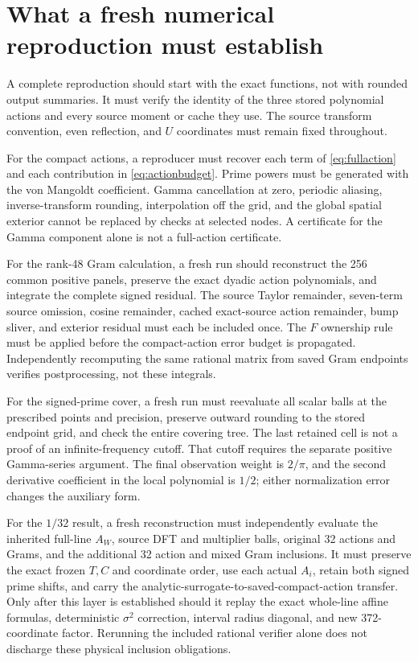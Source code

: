 \documentclass[11pt,a4paper]{article}
\numberwithin{equation}{section}
\theoremstyle{definition}\newtheorem{definition}[theorem]{Definition}
\theoremstyle{remark}\newtheorem{remark}[theorem]{Remark}
\begin{document}
\section{What a fresh numerical reproduction must establish}\label{app:fresh}
A complete reproduction should start with the exact functions, not with rounded output summaries. It must verify the identity of the three stored polynomial actions and every source moment or cache they use. The source transform convention, even reflection, and $U$ coordinates must remain fixed throughout.

For the compact actions, a reproducer must recover each term of \eqref{eq:fullaction} and each contribution in \eqref{eq:actionbudget}. Prime powers must be generated with the von Mangoldt coefficient. Gamma cancellation at zero, periodic aliasing, inverse-transform rounding, interpolation off the grid, and the global spatial exterior cannot be replaced by checks at selected nodes. A certificate for the Gamma component alone is not a full-action certificate.

For the rank-48 Gram calculation, a fresh run should reconstruct the 256 common positive panels, preserve the exact dyadic action polynomials, and integrate the complete signed residual. The source Taylor remainder, seven-term source omission, cosine remainder, cached exact-source action remainder, bump sliver, and exterior residual must each be included once. The $F$ ownership rule must be applied before the compact-action error budget is propagated. Independently recomputing the same rational matrix from saved Gram endpoints verifies postprocessing, not these integrals.

For the signed-prime cover, a fresh run must reevaluate all scalar balls at the prescribed points and precision, preserve outward rounding to the stored endpoint grid, and check the entire covering tree. The last retained cell is not a proof of an infinite-frequency cutoff. That cutoff requires the separate positive Gamma-series argument. The final observation weight is $2/\pi$, and the second derivative coefficient in the local polynomial is $1/2$; either normalization error changes the auxiliary form.

For the $1/32$ result, a fresh reconstruction must independently evaluate the inherited full-line $A_W$, source DFT and multiplier balls, original 32 actions and Grams, and the additional 32 action and mixed Gram inclusions. It must preserve the exact frozen $T,C$ and coordinate order, use each actual $A_i$, retain both signed prime shifts, and carry the analytic-surrogate-to-saved-compact-action transfer. Only after this layer is established should it replay the exact whole-line affine formulas, deterministic $\sigma^2$ correction, interval radius diagonal, and new 372-coordinate factor. Rerunning the included rational verifier alone does not discharge these physical inclusion obligations.
\end{document}

